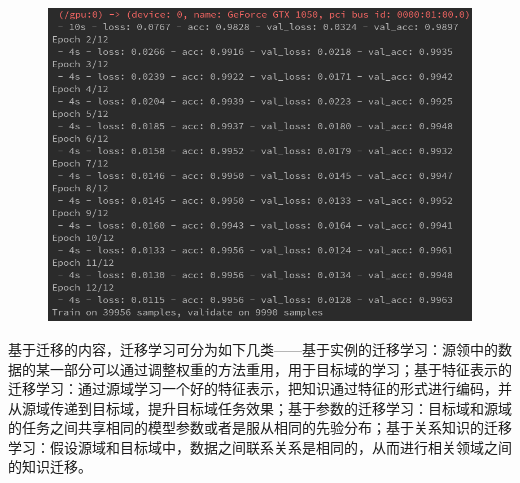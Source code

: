 \documentclass[10.5pt,twocolumn]{jbuaa}
\begin{document}
\begin{figure}[h!]
\centering
\includegraphics [scale=0.5,trim=0 0 0 0]{./image/training.png}
\end{figure}

基于迁移的内容，迁移学习可分为如下几类——基于实例的迁移学习：源领中的数据的某一部分可以通过调整权重的方法重用，用于目标域的学习；基于特征表示的迁移学习：通过源域学习一个好的特征表示，把知识通过特征的形式进行编码，并从源域传递到目标域，提升目标域任务效果；基于参数的迁移学习：目标域和源域的任务之间共享相同的模型参数或者是服从相同的先验分布；基于关系知识的迁移学习：假设源域和目标域中，数据之间联系关系是相同的，从而进行相关领域之间的知识迁移。
\end{document}
